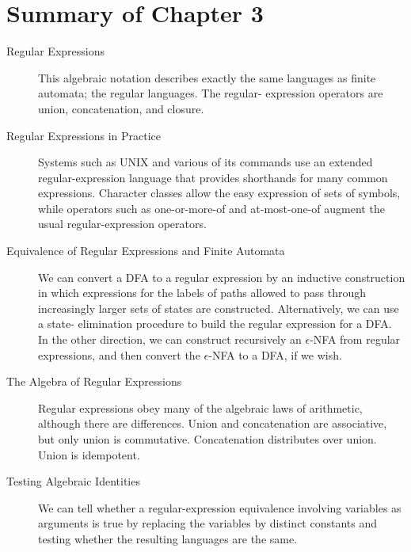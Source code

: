 \documentclass[]{article}
\begin{document}
\section*{Summary of Chapter 3}
  \begin{description}
    \item[Regular Expressions] This algebraic notation describes exactly the
    same languages as finite automata; the regular languages. The regular-
    expression operators are union, concatenation, and closure.
    \item[Regular Expressions in Practice] Systems such as UNIX and various of
    its commands use an extended regular-expression language that provides
    shorthands for many common expressions. Character classes allow the easy
    expression of sets of symbols, while operators such as one-or-more-of and
    at-most-one-of augment the usual regular-expression operators.
    \item[Equivalence of Regular Expressions and Finite Automata] We can convert
    a DFA to a regular expression by an inductive construction in which
    expressions for the labels of paths allowed to pass through increasingly
    larger sets of states are constructed. Alternatively, we can use a state-
    elimination procedure to build the regular expression for a DFA. In the
    other direction, we can construct recursively an $\epsilon$-NFA from regular
    expressions, and then convert the $\epsilon$-NFA to a DFA, if we wish.
    \item[The Algebra of Regular Expressions] Regular expressions obey many of
    the algebraic laws of arithmetic, although there are differences. Union and
    concatenation are associative, but only union is commutative. Concatenation
    distributes over union. Union is idempotent.
    \item[Testing Algebraic Identities] We can tell whether a regular-expression
    equivalence involving variables as arguments is true by replacing the
    variables by distinct constants and testing whether the resulting languages
    are the same.
  \end{description}
\end{document}
